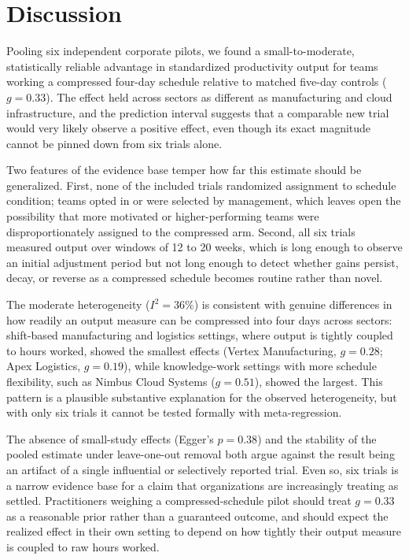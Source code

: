 \section{Discussion}

Pooling six independent corporate pilots, we found a small-to-moderate, statistically
reliable advantage in standardized productivity output for teams working a compressed
four-day schedule relative to matched five-day controls ($g = 0.33$). The effect held across
sectors as different as manufacturing and cloud infrastructure, and the prediction interval
suggests that a comparable new trial would very likely observe a positive effect, even
though its exact magnitude cannot be pinned down from six trials alone.

Two features of the evidence base temper how far this estimate should be generalized.
First, none of the included trials randomized assignment to schedule condition; teams
opted in or were selected by management, which leaves open the possibility that more
motivated or higher-performing teams were disproportionately assigned to the compressed
arm. Second, all six trials measured output over windows of 12 to 20 weeks, which is long
enough to observe an initial adjustment period but not long enough to detect whether gains
persist, decay, or reverse as a compressed schedule becomes routine rather than novel.

The moderate heterogeneity ($I^2 = 36\%$) is consistent with genuine differences in how
readily an output measure can be compressed into four days across sectors: shift-based
manufacturing and logistics settings, where output is tightly coupled to hours worked,
showed the smallest effects (Vertex Manufacturing, $g = 0.28$; Apex Logistics, $g = 0.19$),
while knowledge-work settings with more schedule flexibility, such as Nimbus Cloud Systems
($g = 0.51$), showed the largest. This pattern is a plausible substantive explanation for
the observed heterogeneity, but with only six trials it cannot be tested formally with
meta-regression.

The absence of small-study effects (Egger's $p = 0.38$) and the stability of the pooled
estimate under leave-one-out removal both argue against the result being an artifact of a
single influential or selectively reported trial. Even so, six trials is a narrow evidence
base for a claim that organizations are increasingly treating as settled. Practitioners
weighing a compressed-schedule pilot should treat $g = 0.33$ as a reasonable prior rather
than a guaranteed outcome, and should expect the realized effect in their own setting to
depend on how tightly their output measure is coupled to raw hours worked.
